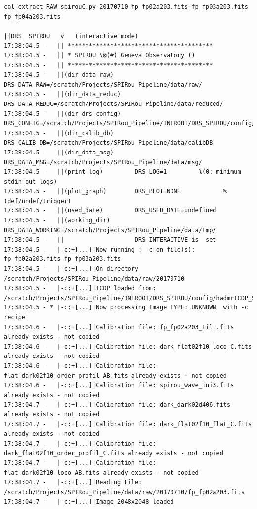 \begin{lstlisting}[style=text]
cal_extract_RAW_spirouC.py 20170710 fp_fp02a203.fits fp_fp03a203.fits
fp_fp04a203.fits

||DRS  SPIROU   v   (interactive mode)
17:38:04.5 -   || *****************************************
17:38:04.5 -   || * SPIROU \@(#) Geneva Observatory ()
17:38:04.5 -   || *****************************************
17:38:04.5 -   ||(dir_data_raw)      DRS_DATA_RAW=/scratch/Projects/SPIRou_Pipeline/data/raw/
17:38:04.5 -   ||(dir_data_reduc)    DRS_DATA_REDUC=/scratch/Projects/SPIRou_Pipeline/data/reduced/
17:38:04.5 -   ||(dir_drs_config)    DRS_CONFIG=/scratch/Projects/SPIRou_Pipeline/INTROOT/DRS_SPIROU/config/
17:38:04.5 -   ||(dir_calib_db)      DRS_CALIB_DB=/scratch/Projects/SPIRou_Pipeline/data/calibDB
17:38:04.5 -   ||(dir_data_msg)      DRS_DATA_MSG=/scratch/Projects/SPIRou_Pipeline/data/msg/
17:38:04.5 -   ||(print_log)         DRS_LOG=1         %(0: minimum stdin-out logs)
17:38:04.5 -   ||(plot_graph)        DRS_PLOT=NONE            %(def/undef/trigger)
17:38:04.5 -   ||(used_date)         DRS_USED_DATE=undefined
17:38:04.5 -   ||(working_dir)       DRS_DATA_WORKING=/scratch/Projects/SPIRou_Pipeline/data/tmp/
17:38:04.5 -   ||                    DRS_INTERACTIVE is  set
17:38:04.5 -   |-c:+[...]|Now running : -c on file(s):  fp_fp02a203.fits fp_fp03a203.fits
17:38:04.5 -   |-c:+[...]|On directory /scratch/Projects/SPIRou_Pipeline/data/raw/20170710
17:38:04.5 -   |-c:+[...]|ICDP loaded from: /scratch/Projects/SPIRou_Pipeline/INTROOT/DRS_SPIROU/config/hadmrICDP_SPIROU.py
17:38:04.5 - * |-c:+[...]|Now processing Image TYPE: UNKNOWN  with -c recipe
17:38:04.6 -   |-c:+[...]|Calibration file: fp_fp02a203_tilt.fits already exists - not copied
17:38:04.6 -   |-c:+[...]|Calibration file: dark_flat02f10_loco_C.fits already exists - not copied
17:38:04.6 -   |-c:+[...]|Calibration file: flat_dark02f10_order_profil_AB.fits already exists - not copied
17:38:04.6 -   |-c:+[...]|Calibration file: spirou_wave_ini3.fits already exists - not copied
17:38:04.7 -   |-c:+[...]|Calibration file: dark_dark02d406.fits already exists - not copied
17:38:04.7 -   |-c:+[...]|Calibration file: dark_flat02f10_flat_C.fits already exists - not copied
17:38:04.7 -   |-c:+[...]|Calibration file: dark_flat02f10_order_profil_C.fits already exists - not copied
17:38:04.7 -   |-c:+[...]|Calibration file: flat_dark02f10_loco_AB.fits already exists - not copied
17:38:04.7 -   |-c:+[...]|Reading File: /scratch/Projects/SPIRou_Pipeline/data/raw/20170710/fp_fp02a203.fits
17:38:04.7 -   |-c:+[...]|Image 2048x2048 loaded

\end{lstlisting}
